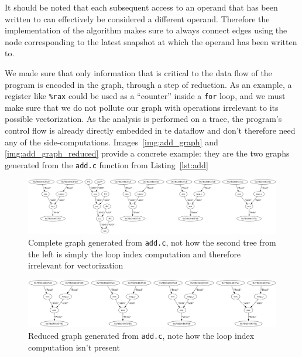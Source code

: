 \documentclass[acmsmall,review, nonacm]{acmart}
\begin{document}


It should be noted that each subsequent access to an operand that has been written to can effectively be considered a 
different operand. Therefore the implementation of the algorithm makes sure to always connect edges using the node 
corresponding to the latest snapshot at which the operand has been written to.

We made sure that only information that is critical to the data flow of the program is encoded in the graph, through a
step of reduction. As an example, a register like \texttt{\%rax} could be used as a ``counter'' inside a  
\texttt{for} loop, and we must make sure that we do not pollute our graph with operations irrelevant to its 
possible vectorization.
As the analysis is performed on a trace, the program's control flow is already directly embedded in te dataflow 
and don't therefore need any of the side-computations.
Images~\ref{img:add_graph} and \ref{img:add_graph_reduced} provide a concrete example: they are the two graphs generated
from the \texttt{add.c} function from Listing~\ref{lst:add}

\begin{figure}[h!]
  \includegraphics*[width=0.9\linewidth]{img/add_graph.png}
  \caption{Complete graph generated from \texttt{add.c}, not how the second tree from the left is simply the loop index computation and therefore irrelevant for vectorization}
  \label{fig:add_graph}
\end{figure}

\begin{figure}[h!]
  \includegraphics*[width=0.9\linewidth]{img/add_graph_reduced.png}
  \caption{Reduced graph generated from \texttt{add.c}, note how the loop index computation isn't present}
  \label{fig:add_graph_reduced}
\end{figure}
\end{document}
